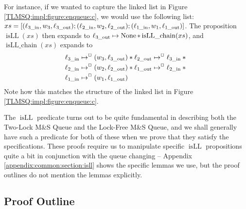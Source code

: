 \documentclass[a4paper, 10pt]{report}
\theoremstyle{definition}
\newcommand{\msq}{M\&S Queue}
\newcommand{\tlmsq}{Two-Lock \msq{}}
\newcommand{\lfmsq}{Lock-Free \msq{}}
\newcommand{\xsc}{xs}
\newcommand{\isLLchain}{\operatorname{isLL\_chain}}
\newcommand{\isLL}{\operatorname{isLL}}
\newcommand{\locinM}[1]{\loc_{#1\_\mathrm{in}}}
\newcommand{\locoutM}[1]{\loc_{#1\_\mathrm{out}}}
\newcommand{\nodeval}{\valB}
\newcommand{\nodevalM}[1]{\nodeval_{#1}}
\begin{document}
For instance, if we wanted to capture the linked list in Figure \ref{TLMSQ:impl:figure:enqueue:c}, we would use the following list: $\xsc = [(\locinM{3}, \nodevalM{3}, \locoutM{3}); (\locinM{2}, \nodevalM{2}, \locoutM{2});  (\locinM{1}, \nodevalM{1}, \locoutM{1})]$. The proposition $\isLL(\xsc)$ then expands to $\locoutM{3} \mapsto \None \star{} \isLLchain(\xsc)$, and $\isLLchain(\xsc)$ expands to
\begin{align*}
  &\locinM{3} \mapsto^{\persistently} (\nodevalM{3}, \locoutM{3}) \star{} \locoutM{2}	\mapsto^{\persistently} \locinM{3}\star{}\\
  &\locinM{2} \mapsto^{\persistently} (\nodevalM{2}, \locoutM{2}) \star{} \locoutM{1}\mapsto^{\persistently} \locinM{2} \star{}\\
  &\locinM{1} \mapsto^{\persistently} (\nodevalM{1}, \locoutM{1})
\end{align*}
Note how this matches the structure of the linked list in Figure \ref{TLMSQ:impl:figure:enqueue:c}.

The $\isLL$ predicate turns out to be quite fundamental in describing both the \tlmsq{} and the \lfmsq{}, and we shall generally have such a predicate for both of these when we prove that they satisfy the specifications. These proofs require us to manipulate specific $\isLL$ propositions quite a bit in conjunction with the queue changing -- Appendix \ref{appendix:common:section:isll} shows the specific lemmas we use, but the proof outlines do not mention the lemmas explicitly.

\subsection{Proof Outline}
\label{TLMSQSPECS:sequential:sub:proof-outline}
\end{document}
